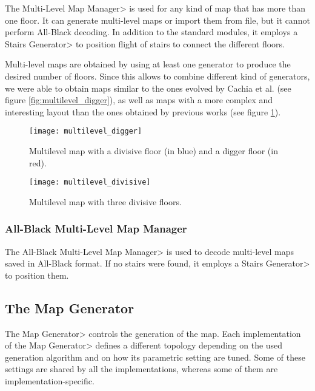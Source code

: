 The \<Multi-Level Map Manager> is used for any kind of map that has more than one floor. It can generate multi-level maps or import them from file, but it cannot perform All-Black decoding. In addition to the standard modules, it employs a \<Stairs Generator> to position flight of stairs to connect the different floors. 

\par

Multi-level maps are obtained by using at least one generator to produce the desired number of floors. Since this allows to combine different kind of generators, we were able to obtain maps similar to the ones evolved by Cachia et al.\cite{MultiLevelEvolution} (see figure \ref{fig:multilevel_digger}), as well as maps with a more complex and interesting layout than the ones obtained by previous works (see figure \ref{fig:multilevel_divisive}).

\begin{figure}[tb]
\begin{minipage}[t]{0.48\linewidth}
	\texttt{[image: multilevel\_digger]}
	\caption{Multilevel map with a divisive floor (in blue) and a digger floor (in red).}
	\label{fig:multilevel_digger}
\end{minipage}
\begin{minipage}[t]{0.48\linewidth}
	\texttt{[image: multilevel\_divisive]}
	\caption{Multilevel map with three divisive floors.}
	\label{fig:multilevel_divisive}
\end{minipage}
\end{figure}

\subsubsection{All-Black Multi-Level Map Manager}

The \<All-Black Multi-Level Map Manager> is used to decode multi-level maps saved in All-Black format. If no stairs were found, it employs a \<Stairs Generator> to position them.


\subsection{The Map Generator}

The \<Map Generator> controls the generation of the map. Each implementation of the \<Map Generator> defines a different topology depending on the used generation algorithm and on how its parametric setting are tuned. Some of these settings are shared by all the implementations, whereas some of them are implementation-specific.

